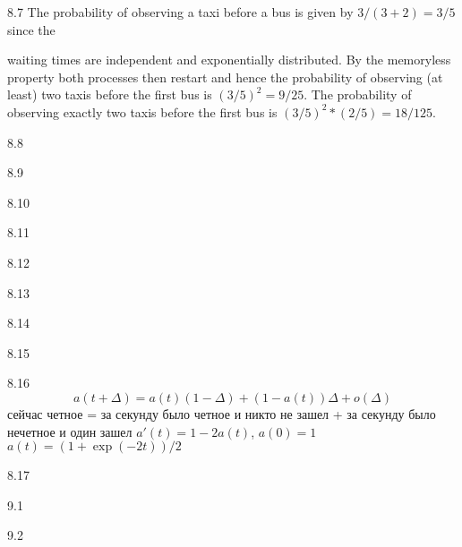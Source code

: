 \protect \hypertarget {soln:8.7}{}
\begin{solution}{{8.7}}
  The probability of observing a taxi before a bus is given by $3/(3+2)=3/5$ since the

  waiting times are independent and exponentially distributed. By the memoryless
  property both processes then restart and hence the probability of observing (at least)
  two taxis before the first bus is $(3/5)^2=9/25$. The probability of observing exactly
  two taxis before the first bus is $(3/5)^2*(2/5)=18/125$.
\end{solution}
\protect \hypertarget {soln:8.8}{}
\begin{solution}{{8.8}}
\end{solution}
\protect \hypertarget {soln:8.9}{}
\begin{solution}{{8.9}}
\end{solution}
\protect \hypertarget {soln:8.10}{}
\begin{solution}{{8.10}}
\end{solution}
\protect \hypertarget {soln:8.11}{}
\begin{solution}{{8.11}}
\end{solution}
\protect \hypertarget {soln:8.12}{}
\begin{solution}{{8.12}}
\end{solution}
\protect \hypertarget {soln:8.13}{}
\begin{solution}{{8.13}}
\end{solution}
\protect \hypertarget {soln:8.14}{}
\begin{solution}{{8.14}}
\end{solution}
\protect \hypertarget {soln:8.15}{}
\begin{solution}{{8.15}}
\end{solution}
\protect \hypertarget {soln:8.16}{}
\begin{solution}{{8.16}}
  \[ a(t+\Delta)=a(t)(1-\Delta)+(1-a(t))\Delta + o(\Delta) \]
  сейчас четное = за секунду было четное и никто не зашел + за секунду было нечетное и один зашел
  $a'(t)=1-2a(t)$, $a(0)=1$
  $a(t)=(1+\exp(-2t))/2$
\end{solution}
\protect \hypertarget {soln:8.17}{}
\begin{solution}{{8.17}}
\end{solution}
\protect \hypertarget {soln:9.1}{}
\begin{solution}{{9.1}}
\end{solution}
\protect \hypertarget {soln:9.2}{}
\begin{solution}{{9.2}}
\end{solution}
